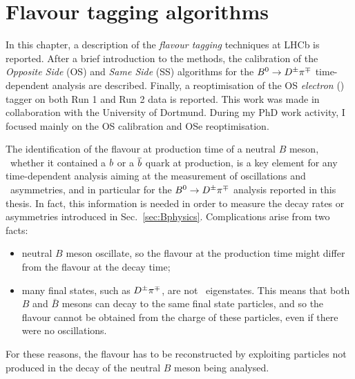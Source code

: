 \section{Flavour tagging algorithms}
\label{sec:tagging}

In this chapter, a description of the \emph{flavour tagging} techniques at LHCb is reported.
After a brief introduction to the methods,
the calibration of the \emph{Opposite Side} (OS) and \emph{Same Side} (SS) algorithms for the $B^0\rightarrow D^\pm\pi^\mp$ 
time-dependent analysis are 
described. Finally, a reoptimisation of the OS \emph{electron} (\OSe) tagger on both Run 1 and Run 2 data is reported. 
This work was made in collaboration with the University of Dortmund. During my PhD work
activity, I focused mainly on the OS calibration and OSe reoptimisation.

The identification of the flavour at production time of a neutral $B$ meson, \ie~whether it contained a $b$ or a $\overline {b}$ quark at
production, is a key element 
for any time-dependent analysis aiming at the measurement of oscillations and \CP~asymmetries, and in particular for the $B^0\rightarrow
D^\pm\pi^\mp$ analysis reported in this thesis. In fact, this information is needed in order to measure the decay rates or asymmetries introduced in Sec.~\ref{sec:Bphysics}.
Complications arise from two facts:
\begin{itemize}[noitemsep,topsep=0pt]
	\item neutral $B$ meson oscillate, so the flavour at the production time might differ from the flavour at the decay time;
	\item many final states, such as $D^\pm\pi^\mp$, are not \CP~eigenstates. This means that both $B$ and $\bar B$ mesons can
	decay to the same final state particles, and so the flavour cannot be obtained from the charge of these particles, even if there were no oscillations.
\end{itemize}
For these reasons, the flavour has to be reconstructed by exploiting particles not produced in the decay of the neutral $B$ meson being analysed.


